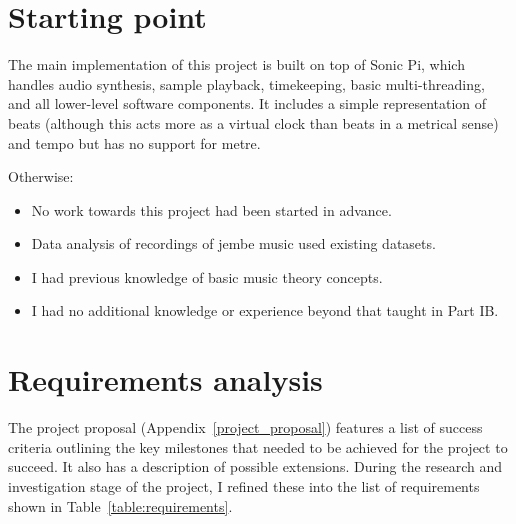 \documentclass[12pt,twoside,openright]{report}
\begin{document}
\section{Starting point} \label{starting_point}

The main implementation of this project is built on top of Sonic Pi, which
handles audio synthesis, sample playback, timekeeping, basic multi-threading,
and all lower-level software components. It includes a simple representation of
beats (although this acts more as a virtual clock than beats in a metrical sense)
and tempo but has no support for metre.

Otherwise:
\begin{itemize}
	\item No work towards this project had been started in advance.
	\item Data analysis of recordings of jembe music used existing datasets.
	\item I had previous knowledge of basic music theory concepts.
    \item I had no additional knowledge or experience beyond that taught in Part IB.
\end{itemize}
\newpage



\section{Requirements analysis} \label{requirements_analysis}

The project proposal (Appendix~\ref{project_proposal}) features a list of success criteria outlining the
key milestones that needed to be achieved for the project to succeed. It also
has a description of possible extensions. During the research and investigation
stage of the project, I refined these into the list of requirements shown in
Table~\ref{table:requirements}.
\end{document}
